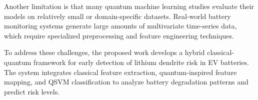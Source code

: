 Another limitation is that many quantum machine learning studies evaluate their models on relatively small or domain-specific datasets. Real-world battery monitoring systems generate large amounts of multivariate time-series data, which require specialized preprocessing and feature engineering techniques.

To address these challenges, the proposed work develops a hybrid classical-quantum framework for early detection of lithium dendrite risk in EV batteries. The system integrates classical feature extraction, quantum-inspired feature mapping, and QSVM classification to analyze battery degradation patterns and predict risk levels.
